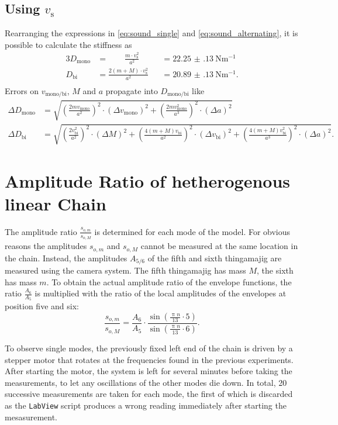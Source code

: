 \subsection{Using $v_\text{s}$}
Rearranging the expressions in \ref{eq:sound_single} and \ref{eq:sound_alternating}, it is possible to calculate the stiffness as
\begin{alignat*}{3}
	D_\text{mono} &=\qquad \frac{m\cdot v_\text{s}^2}{a^2} &&=  \SI{22.25(13)}{\newton\meter^{-1}} \\
	D_\text{bi} &= \frac{2(m+M)\cdot v_\text{s}^2}{a^2} &&= \SI{20.89(13)}{\newton\meter^{-1}}. \\
\end{alignat*}
Errors on $v_\text{mono/bi}$, $M$ and $a$ propagate into $D_\text{mono/bi}$ like
\begin{align*}
	\Delta D_\text{mono} &= \sqrt{ \left(\frac{2mv_\text{mono}}{a^2}\right)^2 \cdot(\Delta v_\text{mono})^2 + \left(\frac{2mv_\text{mono}^2}{a^3}\right)^2 \cdot (\Delta a)^2 } \\
	\Delta D_\text{bi} &= \sqrt{ \left(\frac{2v_\text{bi}^2}{a^2}\right)^2 \cdot (\Delta M)^2
	+ \left(\frac{4(m+M)v_\text{bi}}{a^2}\right)^2 \cdot (\Delta v_\text{bi})^2
	+ \left(\frac{4(m+M)v_\text{bi}^2}{a^3}\right)^2 \cdot (\Delta a)^2 }.
\end{align*}

\section{Amplitude Ratio of hetherogenous linear Chain}
The amplitude ratio $\frac{s_{o,m}}{s_{o,M}}$ is determined for each mode of the model.
For obvious reasons the amplitudes $s_{o,m}$ and $s_{o,M}$ cannot be measured at the same location in the chain.
Instead, the amplitudes $A_{5/6}$ of the fifth and sixth thingamajig are measured using the camera system.
The fifth thingamajig has mass $M$, the sixth has mass $m$.
To obtain the actual amplitude ratio of the envelope functions, the ratio $\frac{A_{6}}{A_{5}}$ is multiplied with the ratio of the local amplitudes of the envelopes at position five and six:
\begin{equation*}
	\frac{s_{o,m}}{s_{o,M}} = \frac{A_{6}}{A_{5}} \cdot \frac{\sin(\frac{\uppi n}{13} \cdot 5)}{\sin(\frac{\uppi n}{13} \cdot 6)}.
\end{equation*}

To observe single modes, the previously fixed left end of the chain is driven by a stepper motor that rotates at the frequencies found in the previous experiments.
After starting the motor, the system is left for several minutes before taking the measurements, to let any oscillations of the other modes die down.
In total, 20 successive measurements are taken for each mode, the first of which is discarded as the \texttt{LabView} script produces a wrong reading immediately after starting the mesasurement.


